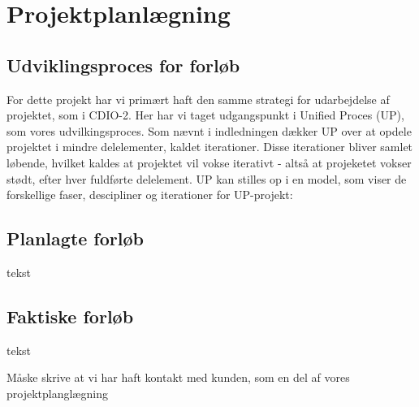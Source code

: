 \documentclass[../main.tex]{subfiles}
\begin{document}
\section{Projektplanlægning}

\subsection{Udviklingsproces for forløb}
\begin{flushleft}
 \newline
   For dette projekt har vi primært haft den samme strategi for udarbejdelse af projektet, som i CDIO-2. Her har vi taget udgangspunkt i Unified Proces (UP), som vores udvilkingsproces. Som nævnt i indledningen dækker UP over at opdele projektet i mindre delelementer, kaldet iterationer. Disse iterationer bliver samlet løbende, hvilket kaldes at projektet vil vokse iterativt - altså at projeketet vokser stødt, efter hver fuldførte delelement. UP kan stilles op i en model, som viser de forskellige faser, descipliner og iterationer for UP-projekt:
\end{flushleft}

\subsection{Planlagte forløb}
\begin{flushleft}
   tekst
\end{flushleft}

\subsection{Faktiske forløb}
\begin{flushleft}
   tekst
\end{flushleft}

\todo Måske skrive at vi har haft kontakt med kunden, som en del af vores projektplanglægning
\end{document}
